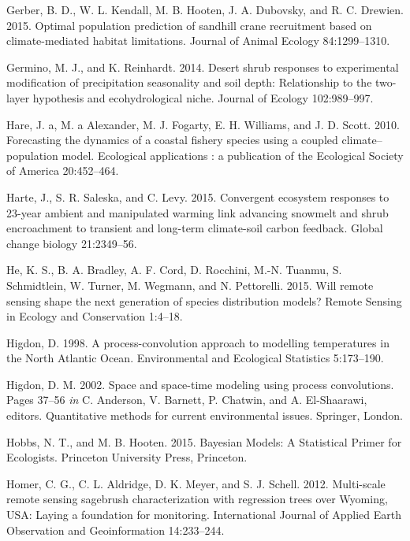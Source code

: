 \documentclass[12pt,]{article}
\begin{document}
\hypertarget{ref-Gerber2015}{}
Gerber, B. D., W. L. Kendall, M. B. Hooten, J. A. Dubovsky, and R. C.
Drewien. 2015. Optimal population prediction of sandhill crane
recruitment based on climate-mediated habitat limitations. Journal of
Animal Ecology 84:1299--1310.

\hypertarget{ref-Germino2014}{}
Germino, M. J., and K. Reinhardt. 2014. Desert shrub responses to
experimental modification of precipitation seasonality and soil depth:
Relationship to the two-layer hypothesis and ecohydrological niche.
Journal of Ecology 102:989--997.

\hypertarget{ref-Hare2010}{}
Hare, J. a, M. a Alexander, M. J. Fogarty, E. H. Williams, and J. D.
Scott. 2010. Forecasting the dynamics of a coastal fishery species using
a coupled climate--population model. Ecological applications : a
publication of the Ecological Society of America 20:452--464.

\hypertarget{ref-Harte2015}{}
Harte, J., S. R. Saleska, and C. Levy. 2015. Convergent ecosystem
responses to 23-year ambient and manipulated warming link advancing
snowmelt and shrub encroachment to transient and long-term climate-soil
carbon feedback. Global change biology 21:2349--56.

\hypertarget{ref-He2015}{}
He, K. S., B. A. Bradley, A. F. Cord, D. Rocchini, M.-N. Tuanmu, S.
Schmidtlein, W. Turner, M. Wegmann, and N. Pettorelli. 2015. Will remote
sensing shape the next generation of species distribution models? Remote
Sensing in Ecology and Conservation 1:4--18.

\hypertarget{ref-Higdon1998}{}
Higdon, D. 1998. A process-convolution approach to modelling
temperatures in the North Atlantic Ocean. Environmental and Ecological
Statistics 5:173--190.

\hypertarget{ref-Higdon2002}{}
Higdon, D. M. 2002. Space and space-time modeling using process
convolutions. Pages 37--56 \emph{in} C. Anderson, V. Barnett, P.
Chatwin, and A. El-Shaarawi, editors. Quantitative methods for current
environmental issues. Springer, London.

\hypertarget{ref-Hobbs2015}{}
Hobbs, N. T., and M. B. Hooten. 2015. Bayesian Models: A Statistical
Primer for Ecologists. Princeton University Press, Princeton.

\hypertarget{ref-Homer2012}{}
Homer, C. G., C. L. Aldridge, D. K. Meyer, and S. J. Schell. 2012.
Multi-scale remote sensing sagebrush characterization with regression
trees over Wyoming, USA: Laying a foundation for monitoring.
International Journal of Applied Earth Observation and Geoinformation
14:233--244.
\end{document}
